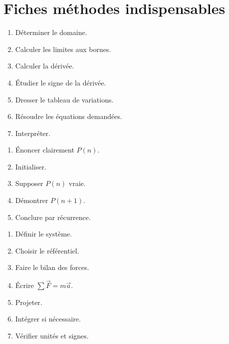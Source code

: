 \documentclass[11pt,a4paper]{article}
\begin{document}
\section{Fiches méthodes indispensables}

\begin{methode}
\begin{enumerate}
  \item Déterminer le domaine.
  \item Calculer les limites aux bornes.
  \item Calculer la dérivée.
  \item Étudier le signe de la dérivée.
  \item Dresser le tableau de variations.
  \item Résoudre les équations demandées.
  \item Interpréter.
\end{enumerate}
\end{methode}

\begin{methode}
\begin{enumerate}
  \item Énoncer clairement $P(n)$.
  \item Initialiser.
  \item Supposer $P(n)$ vraie.
  \item Démontrer $P(n+1)$.
  \item Conclure par récurrence.
\end{enumerate}
\end{methode}

\begin{methode}
\begin{enumerate}
  \item Définir le système.
  \item Choisir le référentiel.
  \item Faire le bilan des forces.
  \item Écrire $\sum \vec F=m\vec a$.
  \item Projeter.
  \item Intégrer si nécessaire.
  \item Vérifier unités et signes.
\end{enumerate}
\end{methode}
\end{document}
